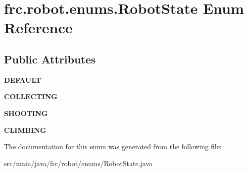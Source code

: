 \hypertarget{enumfrc_1_1robot_1_1enums_1_1_robot_state}{}\section{frc.\+robot.\+enums.\+Robot\+State Enum Reference}
\label{enumfrc_1_1robot_1_1enums_1_1_robot_state}
\subsection*{Public Attributes}
\begin{DoxyCompactItemize}
\item 
\mbox{\label{enumfrc_1_1robot_1_1enums_1_1_robot_state_ae872442cb5c8d11a1b132d541e432dd7}} 
{\bfseries D\+E\+F\+A\+U\+LT}
\item 
\mbox{\label{enumfrc_1_1robot_1_1enums_1_1_robot_state_af4c596ebff307107738afd87a6e610ca}} 
{\bfseries C\+O\+L\+L\+E\+C\+T\+I\+NG}
\item 
\mbox{\label{enumfrc_1_1robot_1_1enums_1_1_robot_state_a715343afb7fa60247e6858b47a23147c}} 
{\bfseries S\+H\+O\+O\+T\+I\+NG}
\item 
\mbox{\label{enumfrc_1_1robot_1_1enums_1_1_robot_state_a1a97b380027f2a17ec0098b0031ed7ed}} 
{\bfseries C\+L\+I\+M\+B\+I\+NG}
\end{DoxyCompactItemize}


The documentation for this enum was generated from the following file\+:\begin{DoxyCompactItemize}
\item 
src/main/java/frc/robot/enums/Robot\+State.\+java\end{DoxyCompactItemize}
